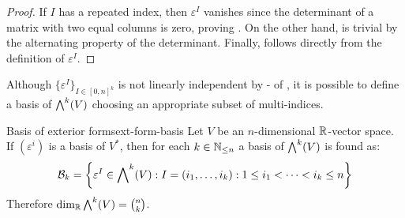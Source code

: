 \begin{proofbox}
  \begin{proof}
    If $ I $ has a repeated index, then $ \varepsilon^I $ vanishes since the determinant of a matrix with two equal columns is zero, proving . On the other hand,  is trivial by the alternating property of the determinant. Finally,  follows directly from the definition of $ \varepsilon^I $.
  \end{proof}
\end{proofbox}

Although $ \{\varepsilon^I\}_{I \in [0,n]^k} $ is not linearly independent by - of , it is possible to define a basis of $ {\bigwedge}^{k}(V) $ choosing an appropriate subset of multi-indices.

\begin{proposition}{Basis of exterior forms}{ext-form-basis}
  Let $ V $ be an $ n $-dimensional $ \mathbb{R} $-vector space. If $ (\varepsilon^i) $ is a basis of $ V^* $, then for each $ k \in \mathbb{N}_{\leq n} $ a basis of $ {\bigwedge}^{k}(V) $ is found as:
  \begin{equation}
    \mathcal{B}_k = \bigg\{ \varepsilon^I \in {\bigwedge}^{k}(V) : I = (i_1 , \dots , i_k) : 1 \leq i_1 < \dots < i_k \leq n \bigg\}
  \end{equation}
  Therefore $ \dim_{\mathbb{R}} {\bigwedge}^{k}(V) = \binom{n}{k} $.
\end{proposition}

